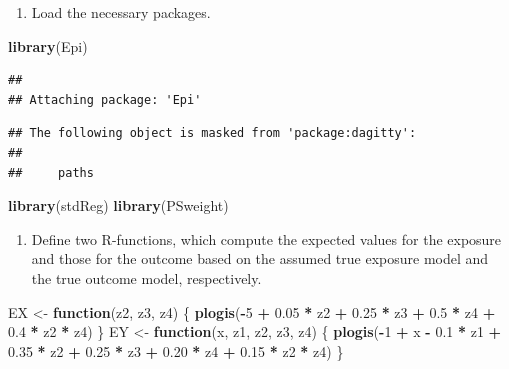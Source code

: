 \documentclass[
]{book}
\newenvironment{Shaded}{\begin{snugshade}}{\end{snugshade}}
\newcommand{\ControlFlowTok}[1]{\textcolor[rgb]{0.13,0.29,0.53}{\textbf{#1}}}
\newcommand{\DecValTok}[1]{\textcolor[rgb]{0.00,0.00,0.81}{#1}}
\newcommand{\FloatTok}[1]{\textcolor[rgb]{0.00,0.00,0.81}{#1}}
\newcommand{\FunctionTok}[1]{\textcolor[rgb]{0.13,0.29,0.53}{\textbf{#1}}}
\newcommand{\NormalTok}[1]{#1}
\newcommand{\OtherTok}[1]{\textcolor[rgb]{0.56,0.35,0.01}{#1}}
\newcommand{\SpecialCharTok}[1]{\textcolor[rgb]{0.81,0.36,0.00}{\textbf{#1}}}
\providecommand{\tightlist}{%
  \setlength{\itemsep}{0pt}\setlength{\parskip}{0pt}}
\begin{document}
\begin{enumerate}
\def\labelenumi{\arabic{enumi}.}
\tightlist
\item
  Load the necessary packages.
\end{enumerate}

\begin{Shaded}
\begin{Highlighting}[]
\FunctionTok{library}\NormalTok{(Epi)}
\end{Highlighting}
\end{Shaded}

\begin{verbatim}
## 
## Attaching package: 'Epi'
\end{verbatim}

\begin{verbatim}
## The following object is masked from 'package:dagitty':
## 
##     paths
\end{verbatim}

\begin{Shaded}
\begin{Highlighting}[]
\FunctionTok{library}\NormalTok{(stdReg)}
\FunctionTok{library}\NormalTok{(PSweight)}
\end{Highlighting}
\end{Shaded}

\begin{enumerate}
\def\labelenumi{\arabic{enumi}.}
\setcounter{enumi}{1}
\tightlist
\item
  Define two R-functions, which compute the expected values
  for the exposure and those for the outcome based on the assumed
  true exposure model and the true outcome model, respectively.
\end{enumerate}

\begin{Shaded}
\begin{Highlighting}[]
\NormalTok{EX }\OtherTok{\textless{}{-}} \ControlFlowTok{function}\NormalTok{(z2, z3, z4) \{}
  \FunctionTok{plogis}\NormalTok{(}\SpecialCharTok{{-}}\DecValTok{5} \SpecialCharTok{+} \FloatTok{0.05} \SpecialCharTok{*}\NormalTok{ z2 }\SpecialCharTok{+} \FloatTok{0.25} \SpecialCharTok{*}\NormalTok{ z3 }\SpecialCharTok{+} \FloatTok{0.5} \SpecialCharTok{*}\NormalTok{ z4 }\SpecialCharTok{+} \FloatTok{0.4} \SpecialCharTok{*}\NormalTok{ z2 }\SpecialCharTok{*}\NormalTok{ z4)}
\NormalTok{\}}
\NormalTok{EY }\OtherTok{\textless{}{-}} \ControlFlowTok{function}\NormalTok{(x, z1, z2, z3, z4) \{}
  \FunctionTok{plogis}\NormalTok{(}\SpecialCharTok{{-}}\DecValTok{1} \SpecialCharTok{+}\NormalTok{ x }\SpecialCharTok{{-}} \FloatTok{0.1} \SpecialCharTok{*}\NormalTok{ z1 }\SpecialCharTok{+} \FloatTok{0.35} \SpecialCharTok{*}\NormalTok{ z2 }\SpecialCharTok{+} \FloatTok{0.25} \SpecialCharTok{*}\NormalTok{ z3 }\SpecialCharTok{+}
    \FloatTok{0.20} \SpecialCharTok{*}\NormalTok{ z4 }\SpecialCharTok{+} \FloatTok{0.15} \SpecialCharTok{*}\NormalTok{ z2 }\SpecialCharTok{*}\NormalTok{ z4)}
\NormalTok{\}}
\end{Highlighting}
\end{Shaded}
\end{document}
